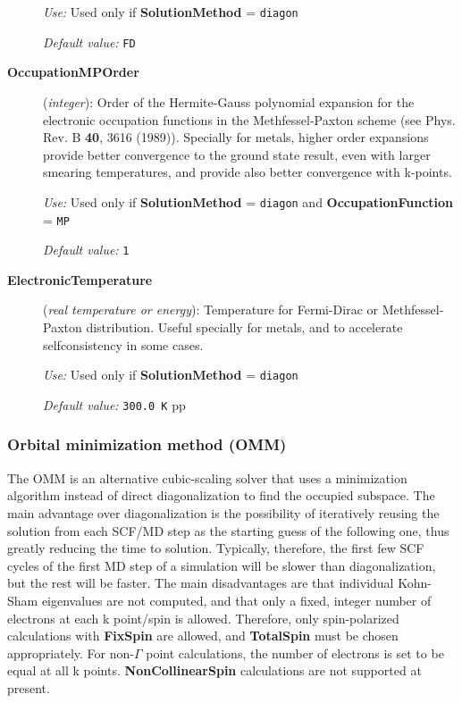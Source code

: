 \begin{description}
\textit{Use:} Used only if \textbf{SolutionMethod} = \texttt{diagon}

\textit{Default value:} \texttt{FD}

\item[\textbf{OccupationMPOrder}](\textit{integer}):
Order of the Hermite-Gauss polynomial expansion for the
electronic occupation functions in the Methfessel-Paxton
scheme (see Phys. Rev. B  \textbf{40}, 3616 (1989)).
Specially for metals, higher order expansions provide better convergence
to the ground state result, even with larger smearing
temperatures, and provide also better convergence with k-points.


\textit{Use:} Used only if \textbf{SolutionMethod} = \texttt{diagon}
and \textbf{OccupationFunction} =  \texttt{MP}

\textit{Default value:} \texttt{1}



\item[\textbf{ElectronicTemperature}] (\textit{real temperature or energy}):
Temperature for Fermi-Dirac or Methfessel-Paxton
distribution. Useful specially for
metals, and to accelerate selfconsistency in some cases.

\textit{Use:} Used only if \textbf{SolutionMethod} = \texttt{diagon}

\textit{Default value:} \texttt{300.0 K}
pp

\end{description}

\subsubsection{Orbital minimization method (OMM)} \label{SolverOMM}

The OMM is an alternative cubic-scaling solver that uses a minimization
algorithm instead of direct diagonalization to find the occupied subspace.
The main advantage over diagonalization is the possibility of iteratively
reusing the solution from each SCF/MD step as the starting guess of the
following one, thus greatly reducing the time to solution. Typically,
therefore, the first few SCF cycles of the first MD step of a simulation
will be slower than diagonalization, but the rest will be faster. The main
disadvantages are that individual Kohn-Sham eigenvalues are not computed,
and that only a fixed, integer number of electrons at each k point/spin is
allowed. Therefore, only spin-polarized calculations with \textbf{FixSpin}
are allowed, and \textbf{TotalSpin} must be chosen appropriately. For
non-$\Gamma$ point calculations, the number of electrons is set to be equal
at all k points. \textbf{NonCollinearSpin} calculations are not supported at
present.

